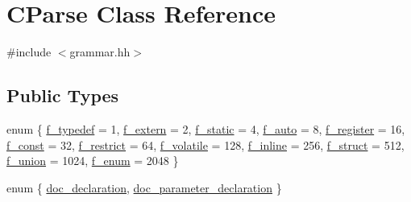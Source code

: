 \hypertarget{class_c_parse}{}\section{C\+Parse Class Reference}
\label{class_c_parse}


{\ttfamily \#include $<$grammar.\+hh$>$}

\subsection*{Public Types}
\begin{DoxyCompactItemize}
\item 
enum \{ \newline
\mbox{\hyperlink{class_c_parse_ae8e1e345251de33336c7fe9ccfbadc0bab4866e82cfe38425a03098e79a79c02a}{f\+\_\+typedef}} = 1, 
\mbox{\hyperlink{class_c_parse_ae8e1e345251de33336c7fe9ccfbadc0ba66f1214814cbd0b627d0131bf4c04b1f}{f\+\_\+extern}} = 2, 
\mbox{\hyperlink{class_c_parse_ae8e1e345251de33336c7fe9ccfbadc0ba3c719862722c51ec3fc0cf53a9a1283c}{f\+\_\+static}} = 4, 
\mbox{\hyperlink{class_c_parse_ae8e1e345251de33336c7fe9ccfbadc0ba54658592dbab42561f28775a18b35fad}{f\+\_\+auto}} = 8, 
\newline
\mbox{\hyperlink{class_c_parse_ae8e1e345251de33336c7fe9ccfbadc0ba3b63f25b71b219c2f9c7a61fef5a84dd}{f\+\_\+register}} = 16, 
\mbox{\hyperlink{class_c_parse_ae8e1e345251de33336c7fe9ccfbadc0ba109acba4eeb3fe08f840ea8540cb33da}{f\+\_\+const}} = 32, 
\mbox{\hyperlink{class_c_parse_ae8e1e345251de33336c7fe9ccfbadc0ba8d62cd762514b8e2c2929dbb2c6d6b1f}{f\+\_\+restrict}} = 64, 
\mbox{\hyperlink{class_c_parse_ae8e1e345251de33336c7fe9ccfbadc0ba6a82e5d4a883e84b2cac790c9835a998}{f\+\_\+volatile}} = 128, 
\newline
\mbox{\hyperlink{class_c_parse_ae8e1e345251de33336c7fe9ccfbadc0ba007ffe1c625bfb70385bb92a0abaaa25}{f\+\_\+inline}} = 256, 
\mbox{\hyperlink{class_c_parse_ae8e1e345251de33336c7fe9ccfbadc0baa50d6eb9d570fc1f6d52dceab5efb40c}{f\+\_\+struct}} = 512, 
\mbox{\hyperlink{class_c_parse_ae8e1e345251de33336c7fe9ccfbadc0ba6fd84c1ba4e6d4b47ca9f90a8cce5b45}{f\+\_\+union}} = 1024, 
\mbox{\hyperlink{class_c_parse_ae8e1e345251de33336c7fe9ccfbadc0baf2cf5853f08a5f8e41c20c70f465cabf}{f\+\_\+enum}} = 2048
 \}
\item 
enum \{ \mbox{\hyperlink{class_c_parse_a1947271b9b0eeb3dd3573744e763d593a30cbc6bd11350e9b87550a3a73c7e4d1}{doc\+\_\+declaration}}, 
\mbox{\hyperlink{class_c_parse_a1947271b9b0eeb3dd3573744e763d593a30204737aae7b64eba795693763a6913}{doc\+\_\+parameter\+\_\+declaration}}
 \}
\end{DoxyCompactItemize}
